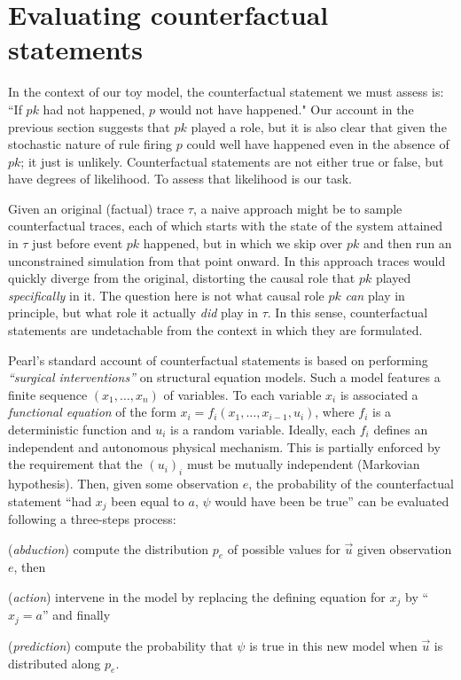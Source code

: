 
\newcommand{\PCFST}[0]{\ProbParen{\CFST{}}}

\newcommand{\ItAbduction}[0]{(\textit{abduction})}
\newcommand{\ItAction}[0]{(\textit{action})}
\newcommand{\ItPrediction}[0]{(\textit{prediction})}


\section{Evaluating counterfactual
  statements}\label{sec:counterfactual}


In the context of our toy model, the counterfactual statement we must
assess is: ``If $pk$ had not happened, $p$ would not have happened."
Our account in the previous section suggests that $pk$ played a role,
but it is also clear that given the stochastic nature of rule firing
$p$ could well have happened even in the absence of $pk$; it just is
unlikely. Counterfactual statements are not either true or false, but
have degrees of likelihood. To assess that likelihood is our task.

Given an original (factual) trace $\tau$, a naive approach might be to
sample counterfactual traces, each of which starts with the state of
the system attained in $\tau$ just before event $pk$ happened, but in
which we skip over $pk$ and then run an unconstrained simulation from
that point onward. In this approach traces would quickly diverge from
the original, distorting the causal role that $pk$ played
\emph{specifically} in it. The question here is not what causal role
$pk$ \emph{can} play in principle, but what role it actually
\emph{did} play in $\tau$. In this sense, counterfactual statements
are undetachable from the context in which they are formulated.

Pearl's standard account of counterfactual statements
\cite{pearl2009causality} is based on performing \textit{``surgical
  interventions''} on structural equation models. Such a model
features a finite sequence $(x_1, \dots, x_n)$ of variables. To each
variable $x_i$ is associated a \emph{functional equation} of the form
$x_i = f_i(x_1, \dots, x_{i-1}, u_i)$, where $f_i$ is a deterministic
function and $u_i$ is a random variable. Ideally, each $f_i$ defines
an independent and autonomous physical mechanism. This is partially
enforced by the requirement that the $(u_i)_i$ must be mutually
independent (Markovian hypothesis). Then, given some observation $e$,
the probability of the counterfactual statement ``had $x_j$ been equal
to $a$, $\psi$ would have been be true'' can be evaluated following a
three-steps process:
\begin{inparaenum}[]
\item \ItAbduction{} compute the distribution $p_e$ of possible values
  for $\vec u$ given observation $e$, then
\item \ItAction{} intervene in the model by replacing the defining
  equation for $x_j$ by ``$x_j = a$'' and finally
\item \ItPrediction{} compute the probability that $\psi$ is true in
  this new model when $\vec{u}$ is distributed along $p_e$.
\end{inparaenum}

